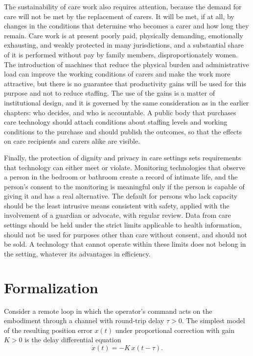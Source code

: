 The sustainability of care work also requires attention, because the demand for care will not be met by the replacement of carers. It will be met, if at all, by changes in the conditions that determine who becomes a carer and how long they remain. Care work is at present poorly paid, physically demanding, emotionally exhausting, and weakly protected in many jurisdictions, and a substantial share of it is performed without pay by family members, disproportionately women. The introduction of machines that reduce the physical burden and administrative load can improve the working conditions of carers and make the work more attractive, but there is no guarantee that productivity gains will be used for this purpose and not to reduce staffing. The use of the gains is a matter of institutional design, and it is governed by the same consideration as in the earlier chapters: who decides, and who is accountable. A public body that purchases care technology should attach conditions about staffing levels and working conditions to the purchase and should publish the outcomes, so that the effects on care recipients and carers alike are visible.

Finally, the protection of dignity and privacy in care settings sets requirements that technology can either meet or violate. Monitoring technologies that observe a person in the bedroom or bathroom create a record of intimate life, and the person's consent to the monitoring is meaningful only if the person is capable of giving it and has a real alternative. The default for persons who lack capacity should be the least intrusive means consistent with safety, applied with the involvement of a guardian or advocate, with regular review. Data from care settings should be held under the strict limits applicable to health information, should not be used for purposes other than care without consent, and should not be sold. A technology that cannot operate within these limits does not belong in the setting, whatever its advantages in efficiency.

\section*{Formalization}

Consider a remote loop in which the operator's command acts on the embodiment through a channel with round-trip delay $\tau>0$. The simplest model of the resulting position error $x(t)$ under proportional correction with gain $K>0$ is the delay differential equation
\[
\dot x(t)=-K\,x(t-\tau).
\]

